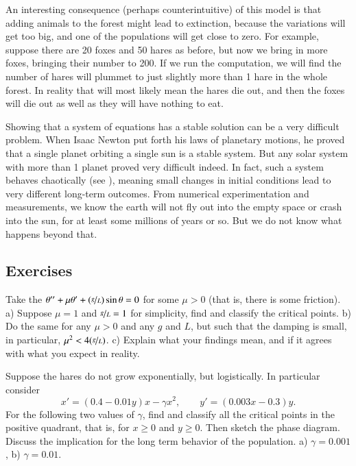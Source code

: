 \documentclass[12pt]{book}
\begin{document}
An interesting consequence (perhaps counterintuitive) of this model is that adding animals to
the forest might lead to extinction, because the variations will get too
big, and one of the populations will get close to zero.  For example, suppose there are 20 foxes and 50 hares as
before, but now we bring in more foxes, bringing their number to 200.  If we
run the computation, we will find the number of hares will plummet to just
slightly more than 1 hare in the whole forest.  In reality that will most
likely mean the hares die out, and then the foxes will die out as well
as they will have nothing to eat.

Showing that a system of equations has a stable solution can be a very
difficult problem.  When Isaac Newton put forth his laws of
planetary motions, he proved that a single planet orbiting a single sun is a
stable system.  But any solar system with more than 1 planet proved very
difficult indeed.  In fact, such a system behaves chaotically (see 
), meaning small changes in initial conditions lead to very
different long-term outcomes.  From numerical experimentation and
measurements, we know the earth will not fly out into the empty space
or crash into the sun, for at least some millions of years or so.
But we do not know what happens beyond that.

\subsection{Exercises}

\begin{exercise}
Take the \emph{} $\theta '' + \mu \theta' +
(\nicefrac{g}{L})
\sin \theta = 0$ for some $\mu > 0$ (that is, there is some friction).
a) Suppose $\mu = 1$ and $\nicefrac{g}{L} = 1$ for simplicity, find and
classify the critical points.  b) Do the same for any $\mu > 0$ and any $g$
and $L$, but such that the damping is small, in particular, $\mu^2 <
4(\nicefrac{g}{L})$.
c) Explain what your findings mean, and if it agrees with what you
expect in reality.
\end{exercise}

\begin{exercise}
Suppose the hares do not grow exponentially, but logistically.  In
particular consider
\begin{equation*}
x' = (0.4-0.01y)x - \gamma x^2, \qquad y' = (0.003x-0.3)y .
\end{equation*}
For the following two values of $\gamma$,
find and classify all the critical points in the positive quadrant, that is, for
$x \geq 0$ and $y \geq 0$.  Then sketch the phase diagram.  Discuss the
implication for the long term behavior of the population.
a) $\gamma=0.001$, b) $\gamma=0.01$.
\end{exercise}
\end{document}
